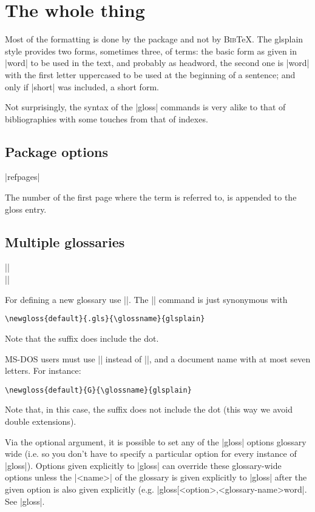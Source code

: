 \documentclass{ltxguide}
\newcommand{\gloss}{\textsf{gloss}}
\newcommand{\bibTeX}{\textsc{Bib}\TeX}
\begin{document}
\section{The whole thing}

Most of the formatting is done by the package and not by \bibTeX. The 
\textsf{glsplain} style provides two forms, sometimes three, of 
terms: the basic form as given in |word| to be used in the text, 
and probably as headword, the second one is |word| with the first 
letter uppercased to be used at the beginning of a sentence; and only 
if |short| was included, a short form.

Not surprisingly, the syntax of the |\gloss{}| commands is very
alike to that of bibliographies with some touches from that
of indexes.

\subsection{Package options}

\begin{decl}
|refpages|
\end{decl}

The number of the first page where the term is referred to, is
appended to the gloss entry.

\subsection{Multiple glossaries}

\begin{decl}
|\makegloss|\\
||
\end{decl}

For defining a new glossary use |\newgloss|. The |\makegloss|
command is just synonymous with
\begin{verbatim}
\newgloss{default}{.gls}{\glossname}{glsplain}
\end{verbatim}
Note that the suffix does include the dot.

MS-DOS users must use |\newgloss| instead of |\makegloss|, and
a document name with at most seven letters. For instance:
\begin{verbatim}
\newgloss{default}{G}{\glossname}{glsplain}
\end{verbatim}
Note that, in this case, the suffix does not include the dot
(this way we avoid double extensions).

Via the optional argument, it is possible to set any of the |\gloss| options
glossary wide (i.e. so you don't have to specify a particular option for every
instance of |\gloss|).  Options given explicitly to |\gloss| can override
these glossary-wide options unless the |<name>| of the glossary is given
explicitly to |\gloss| after the given option is also given explicitly (e.g.
|\gloss[<option>,<glossary-name>{word}|.  See |\gloss|. 
\end{document}
